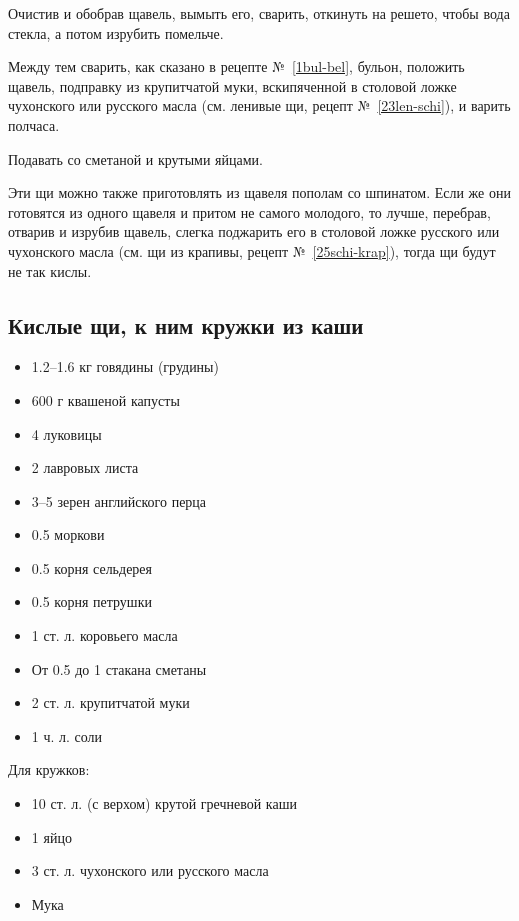 Очистив и обобрав щавель, вымыть его, сварить, откинуть на решето, чтобы вода стекла, а потом изрубить помельче.

Между тем сварить, как сказано в рецепте №~\ref{1bul-bel}, бульон, положить щавель, подправку из крупитчатой муки, вскипяченной в столовой ложке чухонского или русского масла (см. ленивые щи, рецепт №~\ref{23len-schi}), и варить полчаса.

Подавать со сметаной и крутыми яйцами.

Эти щи можно также приготовлять из щавеля пополам со шпинатом. Если же они готовятся из одного щавеля и притом не самого молодого, то лучше, перебрав, отварив и изрубив щавель, слегка поджарить его в столовой ложке русского или чухонского масла (см. щи из крапивы, рецепт №~\ref{25schi-krap}), тогда щи будут не так кислы.

\subsection{Кислые щи, к ним кружки из каши}\label{28kislyje-schi}

\begin{itemize}
	\item 1.2–1.6 кг говядины (грудины) 
	\item 600 г квашеной капусты 
	\item 4 луковицы 
	\item 2 лавровых листа 
	\item 3–5 зерен английского перца 
	\item 0.5 моркови 
	\item 0.5 корня сельдерея 
	\item 0.5 корня петрушки 
	\item 1 ст. л. коровьего масла 
	\item От 0.5 до 1 стакана сметаны 
	\item 2 ст. л. крупитчатой муки 
	\item 1 ч. л. соли 
\end{itemize}
    
Для кружков: 

\begin{itemize}
	\item 10 ст. л. (с верхом) крутой гречневой каши 
	\item 1 яйцо 
	\item 3 ст. л. чухонского или русского масла 
	\item Мука
\end{itemize}

